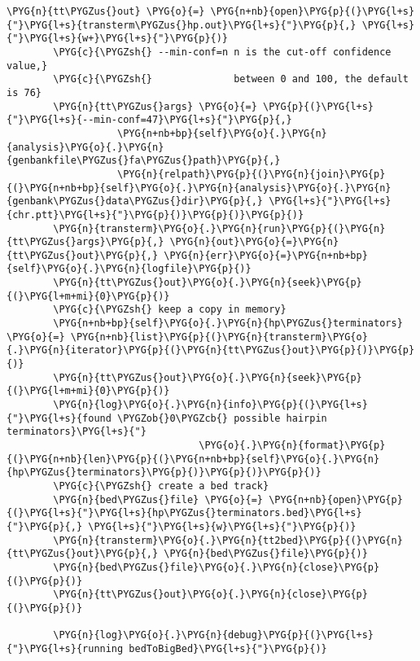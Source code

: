 \begin{Verbatim}[commandchars=\\\{\}]
        \PYG{n}{tt\PYGZus{}out} \PYG{o}{=} \PYG{n+nb}{open}\PYG{p}{(}\PYG{l+s}{"}\PYG{l+s}{transterm\PYGZus{}hp.out}\PYG{l+s}{"}\PYG{p}{,} \PYG{l+s}{"}\PYG{l+s}{w+}\PYG{l+s}{"}\PYG{p}{)}
        \PYG{c}{\PYGZsh{} --min-conf=n n is the cut-off confidence value,}
        \PYG{c}{\PYGZsh{}              between 0 and 100, the default is 76}
        \PYG{n}{tt\PYGZus{}args} \PYG{o}{=} \PYG{p}{(}\PYG{l+s}{"}\PYG{l+s}{--min-conf=47}\PYG{l+s}{"}\PYG{p}{,}
                   \PYG{n+nb+bp}{self}\PYG{o}{.}\PYG{n}{analysis}\PYG{o}{.}\PYG{n}{genbankfile\PYGZus{}fa\PYGZus{}path}\PYG{p}{,}
                   \PYG{n}{relpath}\PYG{p}{(}\PYG{n}{join}\PYG{p}{(}\PYG{n+nb+bp}{self}\PYG{o}{.}\PYG{n}{analysis}\PYG{o}{.}\PYG{n}{genbank\PYGZus{}data\PYGZus{}dir}\PYG{p}{,} \PYG{l+s}{"}\PYG{l+s}{chr.ptt}\PYG{l+s}{"}\PYG{p}{)}\PYG{p}{)}\PYG{p}{)}
        \PYG{n}{transterm}\PYG{o}{.}\PYG{n}{run}\PYG{p}{(}\PYG{n}{tt\PYGZus{}args}\PYG{p}{,} \PYG{n}{out}\PYG{o}{=}\PYG{n}{tt\PYGZus{}out}\PYG{p}{,} \PYG{n}{err}\PYG{o}{=}\PYG{n+nb+bp}{self}\PYG{o}{.}\PYG{n}{logfile}\PYG{p}{)}
        \PYG{n}{tt\PYGZus{}out}\PYG{o}{.}\PYG{n}{seek}\PYG{p}{(}\PYG{l+m+mi}{0}\PYG{p}{)}
        \PYG{c}{\PYGZsh{} keep a copy in memory}
        \PYG{n+nb+bp}{self}\PYG{o}{.}\PYG{n}{hp\PYGZus{}terminators} \PYG{o}{=} \PYG{n+nb}{list}\PYG{p}{(}\PYG{n}{transterm}\PYG{o}{.}\PYG{n}{iterator}\PYG{p}{(}\PYG{n}{tt\PYGZus{}out}\PYG{p}{)}\PYG{p}{)}
        \PYG{n}{tt\PYGZus{}out}\PYG{o}{.}\PYG{n}{seek}\PYG{p}{(}\PYG{l+m+mi}{0}\PYG{p}{)}
        \PYG{n}{log}\PYG{o}{.}\PYG{n}{info}\PYG{p}{(}\PYG{l+s}{"}\PYG{l+s}{found \PYGZob{}0\PYGZcb{} possible hairpin terminators}\PYG{l+s}{"}
                                 \PYG{o}{.}\PYG{n}{format}\PYG{p}{(}\PYG{n+nb}{len}\PYG{p}{(}\PYG{n+nb+bp}{self}\PYG{o}{.}\PYG{n}{hp\PYGZus{}terminators}\PYG{p}{)}\PYG{p}{)}\PYG{p}{)}
        \PYG{c}{\PYGZsh{} create a bed track}
        \PYG{n}{bed\PYGZus{}file} \PYG{o}{=} \PYG{n+nb}{open}\PYG{p}{(}\PYG{l+s}{"}\PYG{l+s}{hp\PYGZus{}terminators.bed}\PYG{l+s}{"}\PYG{p}{,} \PYG{l+s}{"}\PYG{l+s}{w}\PYG{l+s}{"}\PYG{p}{)}
        \PYG{n}{transterm}\PYG{o}{.}\PYG{n}{tt2bed}\PYG{p}{(}\PYG{n}{tt\PYGZus{}out}\PYG{p}{,} \PYG{n}{bed\PYGZus{}file}\PYG{p}{)}
        \PYG{n}{bed\PYGZus{}file}\PYG{o}{.}\PYG{n}{close}\PYG{p}{(}\PYG{p}{)}
        \PYG{n}{tt\PYGZus{}out}\PYG{o}{.}\PYG{n}{close}\PYG{p}{(}\PYG{p}{)}

        \PYG{n}{log}\PYG{o}{.}\PYG{n}{debug}\PYG{p}{(}\PYG{l+s}{"}\PYG{l+s}{running bedToBigBed}\PYG{l+s}{"}\PYG{p}{)}


\end{Verbatim}
